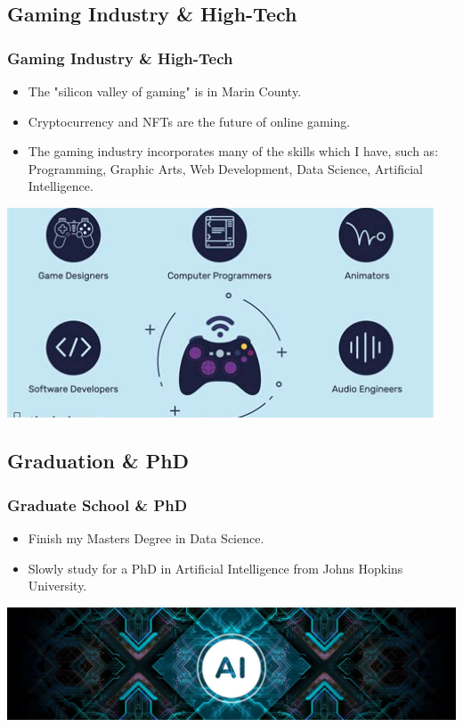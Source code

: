 \documentclass{beamer}
\begin{document}
\subsection{Gaming Industry \& High-Tech}
\begin{frame}
	\frametitle{Gaming Industry \& High-Tech}
	\begin{itemize}
		\item The "silicon valley of gaming" is in Marin County.
		\item Cryptocurrency and NFTs are the future of online gaming.
		\item The gaming industry incorporates many of the skills which I have, such as: Programming, Graphic Arts, Web Development, Data Science, Artificial Intelligence.  
	\end{itemize}
	\begin{center}
		\includegraphics[width = 0.95\textwidth]{images/game industry.png}
	\end{center}
\end{frame}

\subsection{Graduation \& PhD}
	\begin{frame}
		\frametitle{Graduate School \& PhD}
		\begin{itemize}
			\item Finish my Masters Degree in Data Science.  
			\item Slowly study for a PhD in Artificial Intelligence from Johns Hopkins University.  
		\end{itemize}
					\begin{center}
		\includegraphics[width = 1\textwidth]{images/ai banner.jpg}
	\end{center}
	
	\end{frame}
\end{document}
